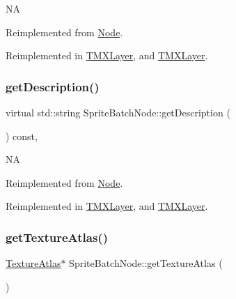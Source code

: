 NA 

Reimplemented from \hyperlink{classNode_a41710375a0d92a4ee54c39fe123b5912}{Node}.



Reimplemented in \hyperlink{classTMXLayer_a1238ed7681395864c66ebda4b90c5d3b}{T\+M\+X\+Layer}, and \hyperlink{classTMXLayer_ae03bc92e2f95a1c6cfce363a8abcfd77}{T\+M\+X\+Layer}.

\mbox{\label{classSpriteBatchNode_a6040059cb5e2e7681cbddc0d55a2859e}} 
\subsubsection{\texorpdfstring{get\+Description()}{getDescription()}\hspace{0.1cm}{\footnotesize\ttfamily [2/2]}}
{\footnotesize\ttfamily virtual std\+::string Sprite\+Batch\+Node\+::get\+Description (\begin{DoxyParamCaption}{ }\end{DoxyParamCaption}) const\hspace{0.3cm}{\ttfamily [override]}, {\ttfamily [virtual]}}

NA 

Reimplemented from \hyperlink{classNode_a41710375a0d92a4ee54c39fe123b5912}{Node}.



Reimplemented in \hyperlink{classTMXLayer_a1238ed7681395864c66ebda4b90c5d3b}{T\+M\+X\+Layer}, and \hyperlink{classTMXLayer_ae03bc92e2f95a1c6cfce363a8abcfd77}{T\+M\+X\+Layer}.

\mbox{\label{classSpriteBatchNode_ad6a2949d1af5b70038158ae0a6c84fff}} 
\subsubsection{\texorpdfstring{get\+Texture\+Atlas()}{getTextureAtlas()}\hspace{0.1cm}{\footnotesize\ttfamily [1/2]}}
{\footnotesize\ttfamily \hyperlink{classTextureAtlas}{Texture\+Atlas}$\ast$ Sprite\+Batch\+Node\+::get\+Texture\+Atlas (\begin{DoxyParamCaption}{ }\end{DoxyParamCaption})\hspace{0.3cm}{\ttfamily [inline]}}

